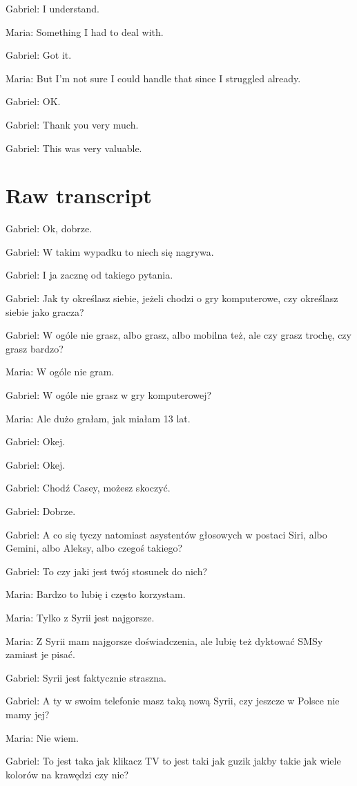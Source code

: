 Gabriel: I understand.

Maria: Something I had to deal with.

Gabriel: Got it.

Maria: But I’m not sure I could handle that since I struggled already.

Gabriel: OK.

Gabriel: Thank you very much.

Gabriel: This was very valuable.


\section{Raw transcript}

Gabriel: Ok, dobrze.

Gabriel: W takim wypadku to niech się nagrywa.

Gabriel: I ja zacznę od takiego pytania.

Gabriel: Jak ty określasz siebie, jeżeli chodzi o gry komputerowe, czy określasz siebie jako gracza?

Gabriel: W ogóle nie grasz, albo grasz, albo mobilna też, ale czy grasz trochę, czy grasz bardzo?

Maria: W ogóle nie gram.

Gabriel: W ogóle nie grasz w gry komputerowej?

Maria: Ale dużo grałam, jak miałam 13 lat.

Gabriel: Okej.

Gabriel: Okej.

Gabriel: Chodź Casey, możesz skoczyć.

Gabriel: Dobrze.

Gabriel: A co się tyczy natomiast asystentów głosowych w postaci Siri, albo Gemini, albo Aleksy, albo czegoś takiego?

Gabriel: To czy jaki jest twój stosunek do nich?

Maria: Bardzo to lubię i często korzystam.

Maria: Tylko z Syrii jest najgorsze.

Maria: Z Syrii mam najgorsze doświadczenia, ale lubię też dyktować SMSy zamiast je pisać.

Gabriel: Syrii jest faktycznie straszna.

Gabriel: A ty w swoim telefonie masz taką nową Syrii, czy jeszcze w Polsce nie mamy jej?

Maria: Nie wiem.

Gabriel: To jest taka jak klikacz TV to jest taki jak guzik jakby takie jak wiele kolorów na krawędzi czy nie?

